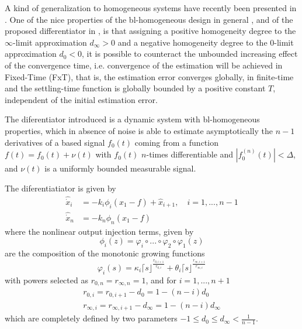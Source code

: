 \documentclass[11pt,letterpaper,twoside,openright]{report}
\begin{document}
A kind of generalization to homogeneous systems have recently been presented in \cite{Moreno2021}. One of the nice properties of the bl-homogeneous design in general \cite{Andrieu2008}, and of the proposed differentiator in \cite{Moreno2021}, is that assigning a positive homogeneity degree to the $\infty$-limit approximation $d_{\infty} > 0$ and a negative homogeneity degree to the $0$-limit approximation $d_0 < 0$, it is possible to counteract the unbounded increasing effect of the convergence time, i.e. convergence of the estimation will be achieved in Fixed-Time (FxT), that is, the estimation error converges globally, in finite-time and the settling-time function is globally bounded by a positive constant $T$, independent of the initial estimation error.

The diferentiator introduced is a dynamic system with bl-homogeneous properties, which in absence of noise is able to estimate asymptotically the $n-1$ derivatives of a based signal $f_0(t)$ coming from a function $f(t)=f_0(t)+\nu(t)$ with $f_0(t)$ $n$-times differentiable and $|f^{(n)}_0(t)|<\Delta$, and $\nu(t)$ is a uniformly bounded measurable signal.

The diferentiatiator is given by 
\begin{equation}\label{ecu: bl-diferentiator}
\begin{split}
\hat{\dot{x}}_i &= -k_i\phi_i(\hat{x}_1-f)+\hat{x}_{i+1}, \quad i=1,...,n-1\\
\hat{\dot{x}}_n &= -k_n\phi_n(\hat{x}_1-f)
\end{split}
\end{equation}
where the nonlinear output injection terms, given by
\begin{equation}
\phi_i(z) = \varphi_i \circ ... \circ \varphi_2 \circ \varphi_1(z)
\end{equation} 
are the composition of the monotonic growing functions
\begin{equation}
\varphi_i(s) = \kappa_i \lceil s \rfloor^{\frac{r_{0,i+1}}{r_{0,i}}} + \theta_i \lceil s \rfloor^{\frac{r_{\infty,i+1}}{r_{\infty,i}}} 
\end{equation}
with powers selected as $r_{0,n}=r_{\infty,n}=1$, and for $i=1,...,n+1$
\begin{equation}
\begin{split}
r_{0,i} = r_{0,i+1}-d_0 = 1-(n-i)d_0 \\
r_{\infty,i} = r_{\infty,i+1}-d_\infty = 1-(n-i)d_\infty
\end{split}
\end{equation}
which are completely defined by two parameters $-1 \leq d_0 \leq d_\infty < \frac{1}{n-1}$.
\end{document}
